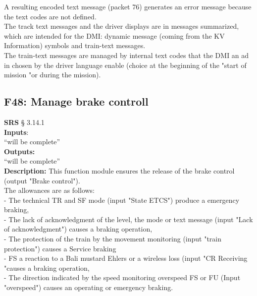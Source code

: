 \documentclass{template/openetcs_report}
\begin{document}
A resulting encoded text message (packet 76) generates an error message because the text codes 
are not defined. \\

The track text messages and the driver displays are in messages 
summarized, which are intended for the DMI: dynamic message (coming from the KV 
Information) symbols and train-text messages. \\

The train-text messages are managed by internal text codes that the DMI an ad in 
chosen by the driver language enable (choice at the beginning of the "start of 
mission "or during the mission).\\

\subsection {F48: Manage brake controll}
\textbf{SRS} § 3.14.1\\

\textbf{Inputs}:\\
``will be complete''\\
 
 \textbf{Outputs:}\\
 ``will be complete''\\
 
 \textbf{Description:} 
This function module ensures the release of the brake control (output 
"Brake control"). \\

The allowances are as follows: \\
 
 - The technical TR and SF mode (input "State ETCS") produce a 
emergency braking, \\

- The lack of acknowledgment of the level, the mode or text message (input 
"Lack of acknowledgment") causes a braking operation, \\

- The protection of the train by the movement monitoring (input "train protection") causes a 
Service braking \\

- FS a reaction to a Bali mustard Ehlers or a wireless loss (input "CR 
Receiving "causes a braking operation, \\

- The direction indicated by the speed monitoring overspeed FS or FU 
(Input "overspeed") causes an operating or emergency braking. \\
\end{document}
